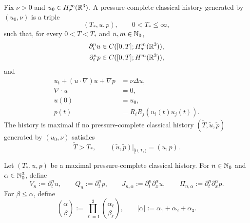 \begin{samepage}
\begin{definition}
\label{u:def:formal-maximal-history}
Fix \(\nu>0\) and \(u_0\in H^\infty_\sigma(\mathbb R^3)\).  A pressure-complete classical
history generated by \((u_0,\nu)\) is a triple
\[
 (T_*,u,p),
 \qquad
 0<T_*\le\infty,
\]
such that, for every \(0<T<T_*\) and \(n,m\in\mathbb N_0\),
\begin{align*}
 \partial_t^nu&\in C([0,T];H^m_\sigma(\mathbb R^3)),\\
 \partial_t^np&\in C([0,T];H^m(\mathbb R^3)),
\end{align*}
and
\begin{align}
 u_t+(u\cdot\nabla)u+\nabla p&=\nu\Delta u,
 \label{u:eq:formal-history-momentum}\\
 \nabla\cdot u&=0,
 \label{u:eq:formal-history-divergence}\\
 u(0)&=u_0,
 \label{u:eq:formal-history-datum}\\
 p(t)&=R_iR_j(u_i(t)u_j(t)).
 \label{u:eq:formal-history-pressure}
\end{align}
The history is maximal if no pressure-complete classical history
\((\widetilde T,\widetilde u,\widetilde p)\) generated by \((u_0,\nu)\)
satisfies
\[
 \widetilde T>T_*,
 \qquad
 (\widetilde u,\widetilde p)|_{[0,T_*)}=(u,p).
\]
\end{definition}
\end{samepage}

\begin{definition}
\label{u:def:formal-mixed-jet}
Let \((T_*,u,p)\) be a maximal pressure-complete classical history.  For
\(n\in\mathbb N_0\) and \(\alpha\in\mathbb N_0^3\), define
\[
 V_n:=\partial_t^nu,
 \qquad
 Q_n:=\partial_t^np,
 \qquad
 J_{n,\alpha}:=\partial_t^n\partial_x^\alpha u,
 \qquad
 \Pi_{n,\alpha}:=\partial_t^n\partial_x^\alpha p.
\]
For \(\beta\le\alpha\), define
\[
 \binom{\alpha}{\beta}
 :=\prod_{\ell=1}^3\binom{\alpha_\ell}{\beta_\ell},
 \qquad
 |\alpha|:=\alpha_1+\alpha_2+\alpha_3.
\]
\end{definition}

